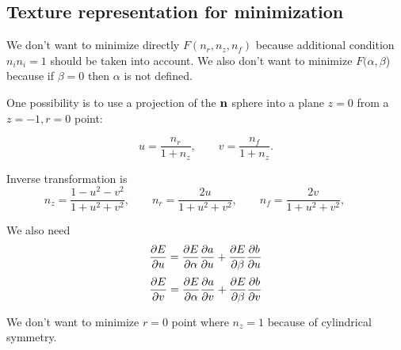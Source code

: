 \documentclass[a4paper]{article}
\begin{document}
\subsection*{Texture representation for minimization}

We don't want to minimize directly $F(n_r, n_z, n_f)$ because additional
condition $n_i n_i = 1$ should be taken into account. We also don't want
to minimize $F(\alpha, \beta$) because if $\beta=0$ then $\alpha$
is not defined.

One possibility is to use a projection of the $\bf n$ sphere into a plane
$z=0$ from a $z=-1, r=0$ point:

$$
u=\frac{n_r}{1+n_z}, \qquad  v=\frac{n_f}{1+n_z}.
$$

Inverse transformation is
$$
n_z = \frac{1-u^2-v^2}{1+u^2+v^2},\qquad
n_r = \frac{2u}{1+u^2+v^2},\qquad
n_f = \frac{2v}{1+u^2+v^2},\qquad
$$

We also need
$$
\frac{\partial E}{\partial u} = \frac{\partial E}{\partial \alpha}\frac{\partial a}{\partial u} + \frac{\partial E}{\partial \beta}\frac{\partial b}{\partial u}
$$
$$
\frac{\partial E}{\partial v} = \frac{\partial E}{\partial \alpha}\frac{\partial a}{\partial v} + \frac{\partial E}{\partial \beta}\frac{\partial b}{\partial v}
$$

We don't want to minimize $r=0$ point where $n_z=1$ because of cylindrical symmetry.
\end{document}
